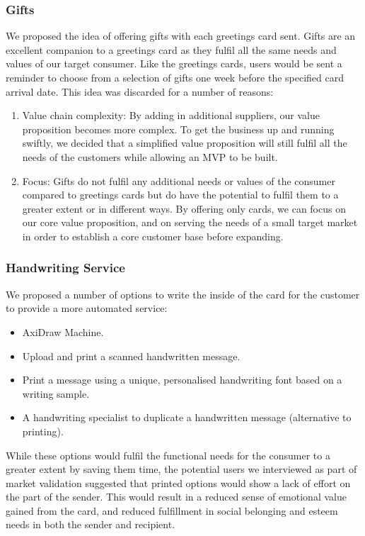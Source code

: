 \documentclass[10pt,a4paper]{article}
\begin{document}
\subsubsection*{Gifts}
We proposed the idea of offering gifts with each greetings card sent. Gifts are an excellent companion to a greetings card as they fulfil all the same needs and values of our target consumer. Like the greetings cards, users would be sent a reminder to choose from a selection of gifts one week before the specified card arrival date.
This idea was discarded for a number of reasons:
\begin{enumerate}
  \item Value chain complexity: By adding in additional suppliers, our value proposition becomes more complex. To get the business up and running swiftly, we decided that a simplified value proposition will still fulfil all the needs of the customers while allowing an MVP to be built.
  \item Focus: Gifts do not fulfil any additional needs or values of the consumer compared to greetings cards but do have the potential to fulfil them to a greater extent or in different ways. By offering only cards, we can focus on our core value proposition, and on serving the needs of a small target market in order to establish a core customer base before expanding.
\end{enumerate}

\subsubsection*{Handwriting Service}
We proposed a number of options to write the inside of the card for the customer to provide a more automated service:
\begin{itemize}
  \item AxiDraw Machine.
  \item Upload and print a scanned handwritten message.
  \item Print a message using a unique, personalised handwriting font based on a writing sample.
  \item A handwriting specialist to duplicate a handwritten message (alternative to printing).
\end{itemize}

While these options would fulfil the functional needs for the consumer to a greater extent by saving them time, the potential users we interviewed as part of market validation suggested that printed options would show a lack of effort on the part of the sender. This would result in a reduced sense of emotional value gained from the card, and reduced fulfillment in social belonging and esteem needs in both the sender and recipient.
\end{document}
